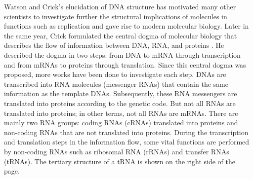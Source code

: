 Watson and Crick's elucidation of DNA structure has motivated many other scientists to investigate further the structural implications of molecules in functions such as replication and gave rise to modern molecular biology. Later in the same year, Crick formulated the central dogma of molecular biology that describes the flow of information between DNA, RNA, and proteins \cite{crick1970central}. He described the dogma in two steps: from DNA to mRNA through transcription and from mRNAs to proteins through translation. Since this central dogma was proposed, more works have been done to investigate each step. DNAs are transcribed into RNA molecules (messenger RNAs) that contain the same information as the template DNAs. Subsequently, these RNA messengers are translated into proteins according to the genetic code. But not all RNAs are translated into proteins; in other terms, not all RNAs are mRNAs. There are mainly two RNA groups: coding RNAs (cRNAs) translated into proteins and non-coding RNAs that are not translated into proteins. During the transcription and translation steps in the information flow, some vital functions are performed by non-coding RNAs such as ribosomal RNA (rRNAs) and transfer RNAs (tRNAs). The tertiary structure of a tRNA is shown on the right side of the page.
